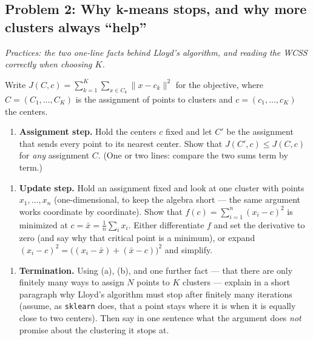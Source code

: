 \documentclass[
  11pt,
]{article}
\providecommand{\tightlist}{%
  \setlength{\itemsep}{0pt}\setlength{\parskip}{0pt}}
\newcommand{\answerspace}[1]{\par\vspace*{#1}}  %
\newcommand{\answerpage}{\clearpage}
\begin{document}
\answerpage

\subsection{Problem 2: Why k-means stops, and why more clusters always
``help''}\label{problem-2-why-k-means-stops-and-why-more-clusters-always-help}

\emph{Practices: the two one-line facts behind Lloyd's algorithm, and
reading the WCSS correctly when choosing \(K\).}

Write \(J(C, c) = \sum_{k=1}^K \sum_{x\in C_k}\|x-c_k\|^2\) for the
objective, where \(C = (C_1,\dots,C_K)\) is the assignment of points to
clusters and \(c = (c_1,\dots,c_K)\) the centers.

\begin{enumerate}
\def\labelenumi{(\alph{enumi})}
\tightlist
\item
  \textbf{Assignment step.} Hold the centers \(c\) fixed and let \(C'\)
  be the assignment that sends every point to its nearest center. Show
  that \(J(C', c) \le J(C, c)\) for \emph{any} assignment \(C\). (One or
  two lines: compare the two sums term by term.)
\end{enumerate}

\answerspace{1.5in}

\begin{enumerate}
\def\labelenumi{(\alph{enumi})}
\setcounter{enumi}{1}
\tightlist
\item
  \textbf{Update step.} Hold an assignment fixed and look at one cluster
  with points \(x_1,\dots,x_n\) (one-dimensional, to keep the algebra
  short --- the same argument works coordinate by coordinate). Show that
  \(f(c) = \sum_{i=1}^n (x_i - c)^2\) is minimized at
  \(c = \bar x = \frac1n\sum_i x_i\). Either differentiate \(f\) and set
  the derivative to zero (and say why that critical point is a minimum),
  or expand \((x_i - c)^2 = \big((x_i-\bar x) + (\bar x - c)\big)^2\)
  and simplify.
\end{enumerate}

\answerspace{2.5in}

\begin{enumerate}
\def\labelenumi{(\alph{enumi})}
\setcounter{enumi}{2}
\tightlist
\item
  \textbf{Termination.} Using (a), (b), and one further fact --- that
  there are only finitely many ways to assign \(N\) points to \(K\)
  clusters --- explain in a short paragraph why Lloyd's algorithm must
  stop after finitely many iterations (assume, as \texttt{sklearn} does,
  that a point stays where it is when it is equally close to two
  centers). Then say in one sentence what the argument does \emph{not}
  promise about the clustering it stops at.
\end{enumerate}
\end{document}
